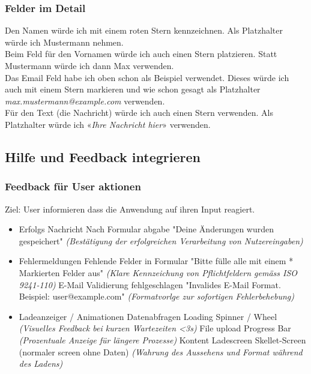 \documentclass[10pt]{article}
\begin{document}
	\subsubsection{Felder im Detail}
	Den Namen würde ich mit einem roten Stern kennzeichnen. Als Platzhalter würde ich Mustermann nehmen.\\
	Beim Feld für den Vornamen würde ich auch einen Stern platzieren. Statt Mustermann würde ich dann Max verwenden.\\
	Das Email Feld habe ich oben schon als Beispiel verwendet. Dieses würde ich auch mit einem Stern markieren und wie schon gesagt als Platzhalter \textit{max.mustermann@example.com} verwenden.\\
	Für den Text (die Nachricht) würde ich auch einen Stern verwenden. Als Platzhalter würde ich «\textit{Ihre Nachricht hier}» verwenden.
	
	\pagebreak
	
	\subsection{Hilfe und Feedback integrieren}
	
	\subsubsection{Feedback für User aktionen}
	
	Ziel: User informieren dass die Anwendung auf ihren Input reagiert.
	
	\begin{itemize}
		\item Erfolgs Nachricht
			\subitem Nach Formular abgabe
				\subsubitem "Deine Änderungen wurden gespeichert"
				\subsubitem \textit{(Bestätigung der erfolgreichen Verarbeitung von Nutzereingaben)}
		\item Fehlermeldungen
			\subitem Fehlende Felder in Formular
				\subsubitem "Bitte fülle alle mit einem * Markierten Felder aus"
				\subsubitem \textit{(Klare Kennzeichung von Pflichtfeldern gemäss ISO 9241-110)}
			\subitem E-Mail Validierung fehlgeschlagen
				\subsubitem "Invalides E-Mail Format. Beispiel: user@example.com"
				\subsubitem \textit{(Formatvorlge zur sofortigen Fehlerbehebung)}
		\item Ladeanzeiger / Animationen
			\subitem Datenabfragen
				\subsubitem Loading Spinner / Wheel
				\subsubitem \textit{(Visuelles Feedback bei kurzen Wartezeiten <3s)}
			\subitem File upload
				\subsubitem Progress Bar
				\subsubitem \textit{(Prozentuale Anzeige für längere Prozesse)}
			\subitem Kontent Ladescreen
				\subsubitem Skellet-Screen (normaler screen ohne Daten)
				\subsubitem \textit{(Wahrung des Aussehens und Format während des Ladens)}
	\end{itemize}
	
\end{document}
